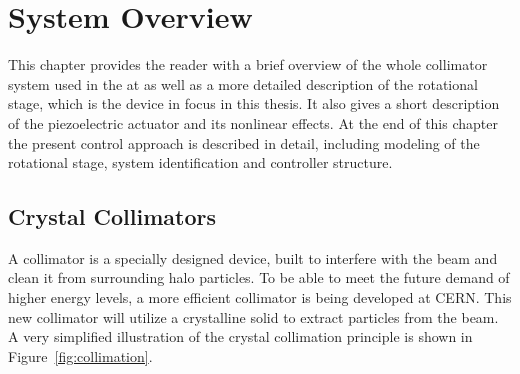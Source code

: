 \chapter{System Overview}\label{cha:systemOverview}
This chapter provides the reader with a brief overview of the whole collimator system used in the \abbrLHC at \abbrCERN as well as a more detailed description of the rotational stage, which is the device in focus in this thesis. It also gives a short description of the piezoelectric actuator and its nonlinear effects. At the end of this chapter the present control approach is described in detail, including modeling of the rotational stage, system identification and controller structure.

\section{Crystal Collimators}
A collimator is a specially designed device, built to interfere with the beam and clean it from surrounding halo particles. To be able to meet the future demand of higher energy levels, a more efficient collimator is being developed at CERN. This new collimator will utilize a crystalline solid to extract particles from the beam. A very simplified illustration of the crystal collimation principle is shown in Figure~\ref{fig:collimation}.

